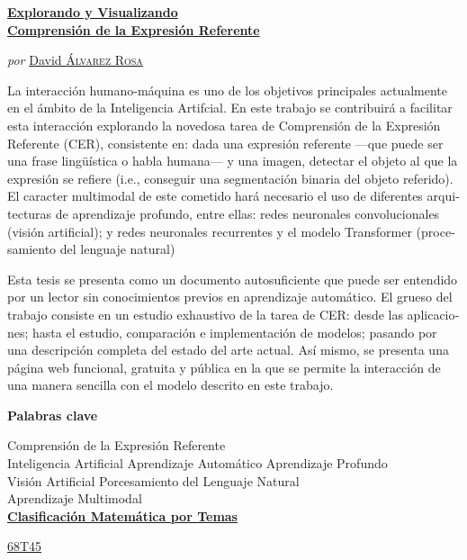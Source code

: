 \begin{otherlanguage}{spanish}
  \begin{center}
    \Large
    \href{https://recomprehension.com/}{\textbf{Explorando y Visualizando\\
        Comprensión de la Expresión Referente}}

    \vspace{2ex} \large \textit{por}
    \href{https://david.alvarezrosa.com/}{David \textsc{Álvarez Rosa}}

    \vspace{3ex} \textbf{\abstractname}
  \end{center}

  \vspace{-2ex}
  \noindent La interacción humano-máquina es uno de los objetivos principales
  actualmente en el ámbito de la Inteligencia Artifcial. En este trabajo se
  contribuirá a facilitar esta interacción explorando la novedosa tarea de
  Comprensión de la Expresión Referente (CER), consistente en: dada una
  expresión referente ---que puede ser una frase lingüística o habla humana---
  y una imagen, detectar el objeto al que la expresión se refiere (i.e.,
  conseguir una segmentación binaria del objeto referido). El caracter
  multimodal de este cometido hará necesario el uso de diferentes arquitecturas
  de aprendizaje profundo, entre ellas: redes neuronales convolucionales
  (visión artificial); y redes neuronales recurrentes y el modelo Transformer
  (procesamiento del lenguaje natural)

  Esta tesis se presenta como un documento autosuficiente que puede ser
  entendido por un lector sin conocimientos previos en aprendizaje
  automático. El grueso del trabajo consiste en un estudio exhaustivo de la
  tarea de CER: desde las aplicaciones; hasta el estudio, comparación e
  implementación de modelos; pasando por una descripción completa del estado
  del arte actual. Así mismo, se presenta una página web funcional, gratuita y
  pública en la que se permite la interacción de una manera sencilla con el
  modelo descrito en este trabajo.

  \begin{center}


    \bigskip\smallskip \textbf{Palabras clave}

    Comprensión de la Expresión Referente\\
    Inteligencia Artificial \textbullet{} Aprendizaje Automático \textbullet{}
    Aprendizaje Profundo\\
    Visión Artificial \textbullet{} Porcesamiento del Lenguaje Natural\\
    Aprendizaje Multimodal\\

    \bigskip
    \href{https://mathscinet.ams.org/msc/msc2010.html}{\textbf{Clasificación
        Matemática por Temas}}

    \href{https://mathscinet.ams.org/msc/msc2010.html?t=68Txx}{68T45}
  \end{center}
\end{otherlanguage}
\vfill\null


